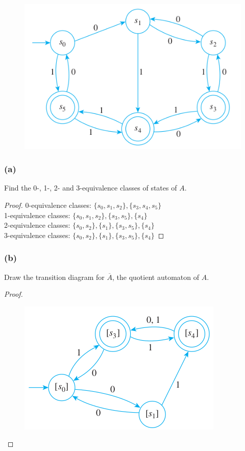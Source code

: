 \documentclass[14pt]{extarticle}
\begin{document}
\begin{figure}[ht!]
    \centering
    \includegraphics[scale=0.5]{../images/12.3.4.png}
\end{figure}

\subsubsection{(a)}
Find the 0-, 1-, 2- and 3-equivalence classes of states of \(A\).

\begin{proof}
    0-equivalence classes: \(\{s_0, s_1, s_2\}, \{s_3, s_4, s_5\}\) \\
    1-equivalence classes: \(\{s_0, s_1, s_2\}, \{s_3, s_5\}, \{s_4\}\) \\
    2-equivalence classes: \(\{s_0, s_2\}, \{s_1\}, \{s_3, s_5\}, \{s_4\}\) \\
    3-equivalence classes: \(\{s_0, s_2\}, \{s_1\}, \{s_3, s_5\}, \{s_4\}\)
\end{proof}

\subsubsection{(b)}
Draw the transition diagram for \(\overline{A}\), the quotient automaton of \(A\).

\begin{proof}
    \begin{figure}[ht!]
        \centering
        \includegraphics[scale=0.5]{../images/12.3.4.b.png}
    \end{figure}
\end{proof}
\end{document}
